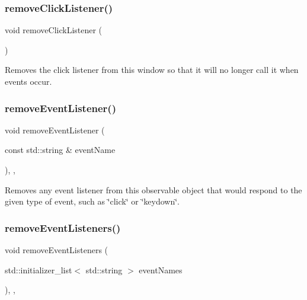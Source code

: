\mbox{\label{classGWindow_ad39d0325cde6b97ebda4b9d7787c633b}} 
\subsubsection{\texorpdfstring{remove\+Click\+Listener()}{removeClickListener()}}
{\footnotesize\ttfamily void remove\+Click\+Listener (\begin{DoxyParamCaption}{ }\end{DoxyParamCaption})\hspace{0.3cm}{\ttfamily [virtual]}}



Removes the click listener from this window so that it will no longer call it when events occur. 

\mbox{\label{classGObservable_acbcf1ed3a851ad8a3c17ef38d86b481d}} 
\subsubsection{\texorpdfstring{remove\+Event\+Listener()}{removeEventListener()}}
{\footnotesize\ttfamily void remove\+Event\+Listener (\begin{DoxyParamCaption}\item[{const std\+::string \&}]{event\+Name }\end{DoxyParamCaption})\hspace{0.3cm}{\ttfamily [protected]}, {\ttfamily [virtual]}, {\ttfamily [inherited]}}



Removes any event listener from this observable object that would respond to the given type of event, such as \char`\"{}click\char`\"{} or \char`\"{}keydown\char`\"{}. 

\mbox{\label{classGObservable_af51cc35c29a1bd1908609d432decdbb6}} 
\subsubsection{\texorpdfstring{remove\+Event\+Listeners()}{removeEventListeners()}}
{\footnotesize\ttfamily void remove\+Event\+Listeners (\begin{DoxyParamCaption}\item[{std\+::initializer\+\_\+list$<$ std\+::string $>$}]{event\+Names }\end{DoxyParamCaption})\hspace{0.3cm}{\ttfamily [protected]}, {\ttfamily [virtual]}, {\ttfamily [inherited]}}



